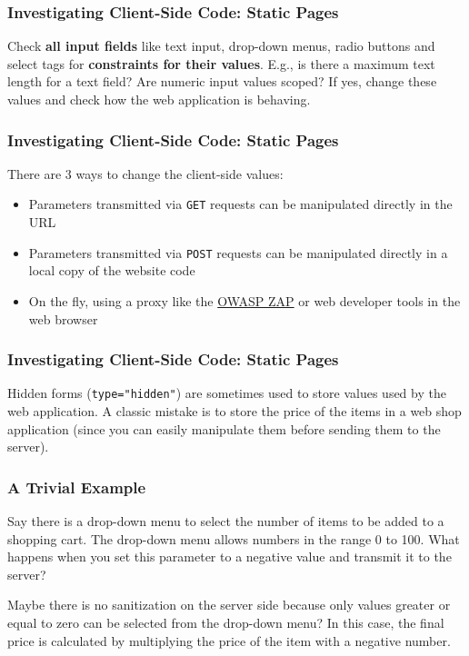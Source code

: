 \documentclass[aspectratio=169]{beamer}
\begin{document}
\begin{frame}
    \frametitle{Investigating Client-Side Code: Static Pages}
    Check \textbf{all input fields} like text input, drop-down menus, radio buttons and select tags for \textbf{constraints for their values}. E.g., is there a maximum text length for a text field? Are numeric input values scoped? If yes, change these values and check how the web application is behaving.
\end{frame}

\begin{frame}
    \frametitle{Investigating Client-Side Code: Static Pages}
    There are 3 ways to change the client-side values:
    \begin{itemize}
        \item Parameters transmitted via \texttt{GET} requests can be manipulated directly in the URL
        \item Parameters transmitted via \texttt{POST} requests can be manipulated directly in a local copy of the website code
        \item On the fly, using a proxy like the \href{https://www.zaproxy.org/}{OWASP ZAP} or web developer tools in the web browser
    \end{itemize}
\end{frame}

\begin{frame}
    \frametitle{Investigating Client-Side Code: Static Pages}
    Hidden forms (\texttt{type="hidden"}) are sometimes used to store values used by the web application. A classic mistake is to store the price of the items in a web shop application (since you can easily manipulate them before sending them to the server).
\end{frame}

\begin{frame}
    \frametitle{A Trivial Example}
    Say there is a drop-down menu to select the number of items to be added to a shopping cart. The drop-down menu allows numbers in the range 0 to 100. What happens when you set this parameter to a negative value and transmit it to the server?
    
    Maybe there is no sanitization on the server side because only values greater or equal to zero can be selected from the drop-down menu? In this case, the final price is calculated by multiplying the price of the item with a negative number.
\end{frame}
\end{document}
